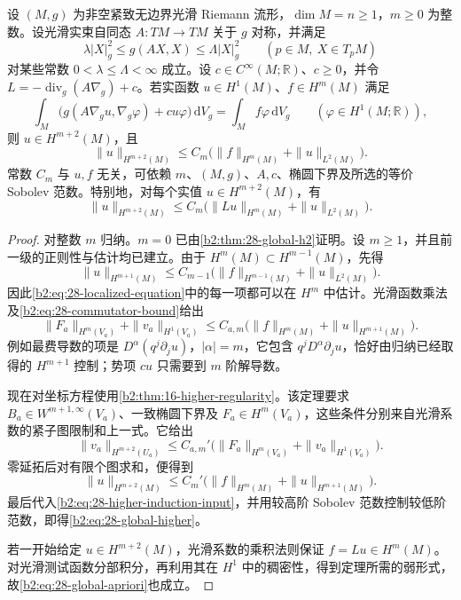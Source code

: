 \begin{theorem}[紧流形上的高阶椭圆估计]\label{b2:thm:28-global-higher}
设 \((M,g)\) 为非空紧致无边界光滑 Riemann 流形，\(\dim M=n\geq1\)，\(m\geq0\) 为整数。设光滑实束自同态 \(A:TM\to TM\) 关于 \(g\) 对称，并满足
\[
 \lambda |X|_g^2\leq g(AX,X)\leq\Lambda |X|_g^2
 \qquad(p\in M,\ X\in T_pM)
\]
对某些常数 \(0<\lambda\leq\Lambda<\infty\) 成立。设 \(c\in C^\infty(M;\mathbb R)\)、\(c\geq0\)，并令 \(L=-\operatorname{div}_g(A\nabla_g)+c\)。若实函数 \(u\in H^1(M)\)、\(f\in H^m(M)\) 满足
\[
 \int_M\bigl(g(A\nabla_g u,\nabla_g\varphi)+cu\varphi\bigr)\,\mathrm dV_g
 =\int_Mf\varphi\,\mathrm dV_g
 \qquad(\varphi\in H^1(M;\mathbb R)),
\]
则 \(u\in H^{m+2}(M)\)，且
\begin{equation}\label{b2:eq:28-global-higher}
 \|u\|_{H^{m+2}(M)}
 \leq C_m\bigl(\|f\|_{H^m(M)}+\|u\|_{L^2(M)}\bigr).
\end{equation}
常数 \(C_m\) 与 \(u,f\) 无关，可依赖 \(m\)、\((M,g)\)、\(A,c\)、椭圆下界及所选的等价 Sobolev 范数。特别地，对每个实值 \(u\in H^{m+2}(M)\)，有
\begin{equation}\label{b2:eq:28-global-apriori}
 \|u\|_{H^{m+2}(M)}
 \leq C_m\bigl(\|Lu\|_{H^m(M)}+\|u\|_{L^2(M)}\bigr).
\end{equation}
\end{theorem}
\begin{proof}
对整数 \(m\) 归纳。\(m=0\) 已由\cref{b2:thm:28-global-h2}证明。设 \(m\geq1\)，并且前一级的正则性与估计均已建立。由于 \(H^m(M)\subset H^{m-1}(M)\)，先得
\begin{equation}\label{b2:eq:28-higher-induction-input}
 \|u\|_{H^{m+1}(M)}
 \leq C_{m-1}\bigl(\|f\|_{H^{m-1}(M)}+\|u\|_{L^2(M)}\bigr).
\end{equation}
因此\eqref{b2:eq:28-localized-equation}中的每一项都可以在 \(H^m\) 中估计。光滑函数乘法及\eqref{b2:eq:28-commutator-bound}给出
\[
 \|F_a\|_{H^m(V_a)}+\|v_a\|_{H^1(V_a)}
 \leq C_{a,m}\bigl(\|f\|_{H^m(M)}+\|u\|_{H^{m+1}(M)}\bigr).
\]
例如最费导数的项是 \(D^\alpha(q^j\partial_j u)\)，\(|\alpha|=m\)，它包含 \(q^jD^\alpha\partial_j u\)，恰好由归纳已经取得的 \(H^{m+1}\) 控制；势项 \(cu\) 只需要到 \(m\) 阶解导数。

现在对坐标方程使用\cref{b2:thm:16-higher-regularity}。该定理要求 \(B_a\in W^{m+1,\infty}(V_a)\)、一致椭圆下界及 \(F_a\in H^m(V_a)\)，这些条件分别来自光滑系数的紧子图限制和上一式。它给出
\[
 \|v_a\|_{H^{m+2}(U_a)}
 \leq C_{a,m}'\bigl(\|F_a\|_{H^m(V_a)}+\|v_a\|_{H^1(V_a)}\bigr).
\]
零延拓后对有限个图求和，便得到
\[
 \|u\|_{H^{m+2}(M)}
 \leq C_m'\bigl(\|f\|_{H^m(M)}+\|u\|_{H^{m+1}(M)}\bigr).
\]
最后代入\eqref{b2:eq:28-higher-induction-input}，并用较高阶 Sobolev 范数控制较低阶范数，即得\eqref{b2:eq:28-global-higher}。

若一开始给定 \(u\in H^{m+2}(M)\)，光滑系数的乘积法则保证 \(f=Lu\in H^m(M)\)。对光滑测试函数分部积分，再利用其在 \(H^1\) 中的稠密性，得到定理所需的弱形式，故\eqref{b2:eq:28-global-apriori}也成立。
\end{proof}

